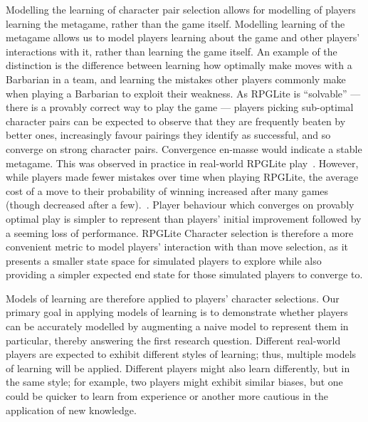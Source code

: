 Modelling the learning of character pair selection allows for modelling of
players learning the metagame, rather than the game itself. Modelling learning
of the metagame allows us to model players learning about the game and other
players' interactions with it, rather than learning the game itself. An example
of the distinction is the difference between learning how optimally make moves
with a Barbarian in a team, and learning the mistakes other players commonly
make when playing a Barbarian to exploit their weakness. As RPGLite is
``solvable'' --- there is a provably correct way to play the game --- players
picking sub-optimal character pairs can be expected to observe that they are
frequently beaten by better ones, increasingly favour pairings they identify as
successful, and so converge on strong character pairs. Convergence en-masse
would indicate a stable metagame. This was observed in practice in real-world
RPGLite play~\cite{kavanagh2021gameplay}. However, while players made fewer
mistakes over time when playing RPGLite, the average cost of a move to their
probability of winning increased after many games (though decreased after a
few).~\cite{kavanagh2021gameplay}. Player behaviour which converges on provably
optimal play is simpler to represent than players' initial improvement followed
by a seeming loss of performance. RPGLite Character selection is therefore a
more convenient metric to model players' interaction with than move selection,
as it presents a smaller state space for simulated players to explore while also
providing a simpler expected end state for those simulated players to converge
to.

Models of learning are therefore applied to players' character selections. Our
primary goal in applying models of learning is to demonstrate whether players
can be accurately modelled by augmenting a naive model to represent them in
particular, thereby answering the first research question. Different real-world
players are expected to exhibit different styles of learning; thus, multiple
models of learning will be applied. Different players might also learn
differently, but in the same style; for example, two players might exhibit
similar biases, but one could be quicker to learn from experience or another
more cautious in the application of new knowledge.


